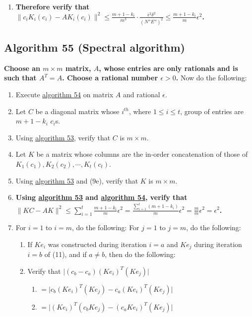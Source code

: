 \documentclass[twocolumn]{article}
\begin{document}
\begin{enumerate}
\begin{enumerate}
\begin{enumerate}
					\item \textbf{Therefore verify that $\lVert c_iK_i(c_i)-AK_i(c_i)\rVert^2\le\frac{m+1-k_i}{m^3}\cdot\frac{\epsilon^2\delta^2}{(N''E'')^2}\le\frac{m+1-k_i}{m}\epsilon^2$.}
					\end{enumerate}
				\end{enumerate}
			\end{enumerate}
		\subsection{Algorithm 55 (Spectral algorithm)}\label{sec:algorithm 55}
			\textbf{Choose an $m\times m$ matrix, $A$, whose entries are only rationals and is such that $A^T=A$. Choose a rational number $\epsilon>0$.} Now do the following:
			\begin{enumerate}
				\item Execute \hyperref[sec:algorithm 54]{algorithm 54} on matrix $A$ and rational $\epsilon$.
				\item Let $C$ be a diagonal matrix whose $i^{th}$, where $1\le i\le t$, group of entries are $m+1-k_i$ $c_i$s.
				\item Using \hyperref[sec:algorithm 53]{algorithm 53}, verify that $C$ is $m\times m$.
				\item Let $K$ be a matrix whose columns are the in-order concatenation of those of $K_1(c_1),K_2(c_2),\cdots,K_t(c_t)$.
				\item Using \hyperref[sec:algorithm 53]{algorithm 53} and (9e), verify that $K$ is $m\times m$.
				\item \textbf{Using \hyperref[sec:algorithm 53]{algorithm 53} and \hyperref[sec:algorithm 54]{algorithm 54}, verify that $\lVert KC-AK\rVert^2\le\sum_{i=1}^t\frac{m+1-k_i}{m}\epsilon^2=\frac{\sum_{i=1}^t (m+1-k_i)}{m}\epsilon^2=\frac{m}{m}\epsilon^2=\epsilon^2$.}
				\item For $i=1$ to $i=m$, do the following: For $j=1$ to $j=m$, do the following:
				\begin{enumerate}
					\item If $Ke_i$ was constructed during iteration $i=a$ and $Ke_j$ during iteration $i=b$ of (11), and if $a\ne b$, then do the following:
					\item Verify that $\lvert(c_b-c_a)(Ke_i)^T(Ke_j)\rvert$
					\begin{enumerate}
						\item $=\lvert c_b(Ke_i)^T(Ke_j)-c_a(Ke_i)^T(Ke_j)\rvert$
						\item $=\lvert(Ke_i)^T(c_bKe_j)-(c_aKe_i)^T(Ke_j)\rvert$

\end{enumerate}
\end{enumerate}
\end{enumerate}
\end{document}
